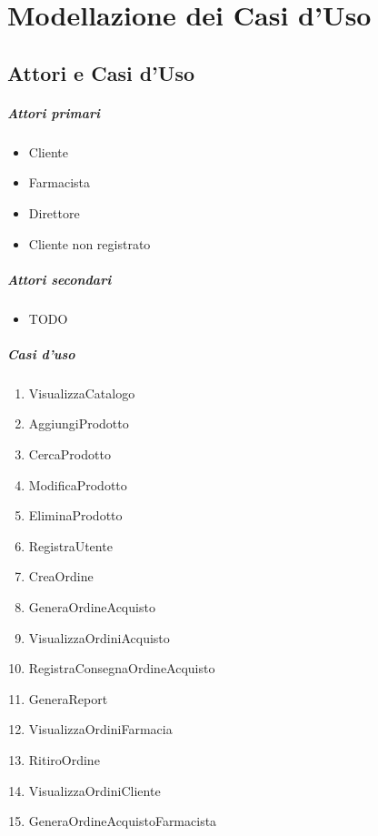 \chapter{Modellazione dei Casi d'Uso}

\section{Attori e Casi d'Uso}

\paragraph{Attori primari}
\begin{itemize}
	\item Cliente
	\item Farmacista
	\item Direttore
	\item Cliente non registrato
\end{itemize}

\paragraph{Attori secondari}
\begin{itemize}
	\item TODO
\end{itemize}

\paragraph{Casi d'uso}
\begin{enumerate}
	\item VisualizzaCatalogo %
	\item AggiungiProdotto %
	\item CercaProdotto %
	\item ModificaProdotto %
	\item EliminaProdotto %
	\item RegistraUtente %
	\item CreaOrdine %
	\item GeneraOrdineAcquisto %
	\item VisualizzaOrdiniAcquisto %
	\item RegistraConsegnaOrdineAcquisto %
	\item GeneraReport %
	\item VisualizzaOrdiniFarmacia %
	\item RitiroOrdine %
	\item VisualizzaOrdiniCliente %
	\item GeneraOrdineAcquistoFarmacista %
\end{enumerate}

